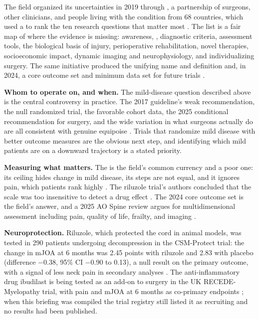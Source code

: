 \documentclass[11pt, letterpaper]{article}
\begin{document}
The field organized its uncertainties in 2019 through , a partnership of surgeons, other clinicians, and people living with the condition from 68 countries, which used a  to rank the ten research questions that matter most \citep{davies2022why}. The list is a fair map of where the evidence is missing: awareness, , diagnostic criteria, assessment tools, the biological basis of injury, perioperative rehabilitation, novel therapies, socioeconomic impact, dynamic imaging and neurophysiology, and individualizing surgery. The same initiative produced the unifying name and definition and, in 2024, a core outcome set and minimum data set for future trials \citep{davies2024def,davies2024cos}.

\textbf{Whom to operate on, and when.} The mild-disease question described above is the central controversy in practice. The 2017 guideline's weak recommendation, the null randomized trial, the favorable cohort data, the 2025 conditional recommendation for surgery, and the wide variation in what surgeons actually do are all consistent with genuine equipoise \citep{fehlings2017cpg,kadanka2011,badhiwala2019,fehlings2025,brannigan2024}. Trials that randomize mild disease with better outcome measures are the obvious next step, and identifying which mild patients are on a downward trajectory is a stated priority.

\textbf{Measuring what matters.} The  is the field's common currency and a poor one: its ceiling hides change in mild disease, its steps are not equal, and it ignores pain, which patients rank highly \citep{tetreault2015mcid,kopjar2015}. The \gls{riluzole} trial's authors concluded that the scale was too insensitive to detect a drug effect \citep{fehlings2021}. The 2024 core outcome set is the field's answer, and a 2025 AO Spine review argues for multidimensional assessment including pain, quality of life, frailty, and imaging \citep{davies2024cos,fehlings2025}.

\textbf{Neuroprotection.} Riluzole, which protected the cord in animal models, was tested in 290 patients undergoing decompression in the CSM-Protect trial: the change in mJOA at 6 months was 2.45 points with riluzole and 2.83 with placebo (difference \ensuremath{-}0.38, 95\% CI \ensuremath{-}0.90 to 0.13), a null result on the primary outcome, with a signal of less neck pain in secondary analyses \citep{fehlings2021}. The anti-inflammatory drug \gls{ibudilast} is being tested as an add-on to surgery in the UK RECEDE-Myelopathy trial, with pain and mJOA at 6 months as co-primary endpoints \citep{davies2023recede}; when this briefing was compiled the trial registry still listed it as recruiting and no results had been published.
\end{document}
